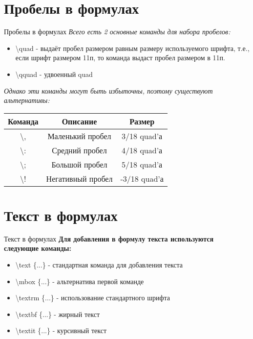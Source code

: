 \documentclass[aspectratio=169]{beamer}
\begin{document}
\section{Пробелы в формулах}
\begin{frame}{Пробелы в формулах}
    \textit{Всего есть 2 основные команды для набора пробелов:}
    \begin{itemize}
        \item \textbackslash quad - выдаёт пробел размером равным размеру используемого шрифта, т.е., если шрифт размером 11п, то команда выдаст пробел размером в 11п.
        \item \textbackslash qquad - удвоенный quad
    \end{itemize}
    \textit{Однако эти команды могут быть избыточны, поэтому существуют альтернативы:}
    \begin{center}
        \begin{tabular}[h]{|c|c|c|}
        \hline
        Команда & Описание & Размер \\ \hline
        \textbackslash , & Маленький пробел & 3/18 quad'а\\ \hline
        \textbackslash : & Средний пробел & 4/18 quad'а\\ \hline
        \textbackslash ; & Большой пробел & 5/18 quad'а\\ \hline
        \textbackslash ! & Негативный пробел & -3/18 quad'а\\ \hline
        \end{tabular}
    \end{center}
\end{frame}

\section{Текст в формулах}
\begin{frame}{Текст в формулах}
    \textbf{Для добавления в формулу текста используются следующие команды:}
    \begin{itemize}
        \item \textbackslash text \{...\} - стандартная команда для добавления текста
        \item \textbackslash mbox \{...\} - альтернатива первой команде
        \item \textbackslash textrm \{...\} - использование стандартного шрифта
        \item \textbackslash textbf \{...\} - жирный текст
        \item \textbackslash textit \{...\} - курсивный текст
    \end{itemize}
\end{frame}
\end{document}
